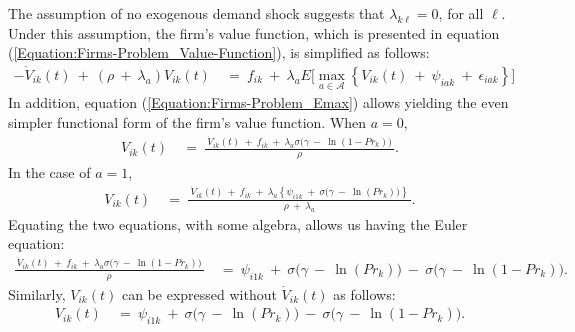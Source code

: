 The assumption of no exogenous demand shock suggests that $\lambda_{k\ell} = 0$, for all $\ell$. 
%    
%    
%    
%    
Under this assumption, the firm's value function, which is presented in equation (\ref{Equation:Firms-Problem_Value-Function}), is simplified as follows:
\begin{equation*}
\begin{split}
    -\dot{V}_{ik} (t) \ + \ (\rho \ + \ \lambda_{a}) V_{ik}(t) \
    & = \ f_{ik} \ + \ \lambda_{a} E\Big[ \underset{a \in \mathcal{A}}{\max} \left\{ V_{ik} (t) \ + \ \psi_{iak} \ + \ \epsilon_{iak} \right\} \Big]
\end{split}
\end{equation*}
In addition, equation (\ref{Equation:Firms-Problem_Emax}) allows yielding the even simpler functional form of the firm's value function. When $a = 0$,
\begin{equation*}
\begin{split}
    V_{ik} (t) \
    & = \ \frac{ \ \dot{V}_{ik} (t) \ + \ f_{ik} \ + \ \lambda_{a} \sigma \big( \gamma \ - \ \ln(1 - Pr_{k}) \big) \ }{\rho}.
\end{split}
\end{equation*}
In the case of $a = 1$,
\begin{equation*}
\begin{split}
    V_{ik} (t) \
    & = \ \frac{ \ \dot{V}_{ik} (t) \ + \ f_{ik} \ + \ \lambda_{a} \left\{ \psi_{i1k} \ + \ \sigma \big( \gamma \ - \ \ln(Pr_{k}) \big) \right\} \ }{\rho \ + \ \lambda_{a}}.
\end{split}
\end{equation*}
Equating the two equations, with some algebra, allows us having the Euler equation:
\begin{equation*}
\begin{split}
    \frac{ \ \dot{V}_{ik} (t) \ + \ f_{ik} \ + \ \lambda_{a} \sigma \big( \gamma \ - \ \ln(1 - Pr_{k}) \big) \ }{\rho} \
    & = \ \psi_{i1k} \ + \ \sigma \big( \gamma \ - \ \ln(Pr_{k}) \big) \ - \ \sigma \big( \gamma \ - \ \ln(1 - Pr_{k}) \big).
\end{split}
\end{equation*}
Similarly, $V_{ik} (t)$ can be expressed without $\dot{V}_{ik} (t)$ as follows:
\begin{equation*}
\begin{split}
    V_{ik} (t) \
    & = \ \psi_{i1k} \ + \ \sigma \big( \gamma \ - \ \ln(Pr_{k}) \big) \ - \ \sigma \big( \gamma \ - \ \ln(1 - Pr_{k}) \big).
\end{split}
\end{equation*}
